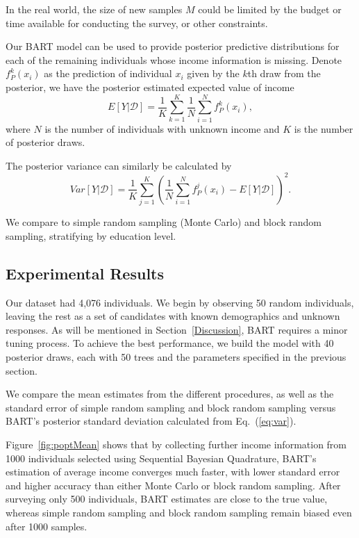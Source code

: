 In the real world, the size of new samples $M$ could be limited by the budget or time available for conducting the survey, or other constraints.

Our BART model can be used to provide posterior predictive distributions for each of the remaining individuals whose income information is missing. Denote $f_P^k(x_i)$ as the prediction of individual $x_i$ given by the $k$th  draw from the posterior, we have the posterior estimated expected value of income 
\begin{equation}
\label{eq:mean}
    E[Y|\mathcal{D}] = \frac{1}{K}\sum_{k=1}^K\frac{1}{N}\sum_{i=1}^N f_P^k(x_i),
\end{equation}
where $N$ is the number of individuals with unknown income and $K$ is the number of posterior draws.

The posterior variance can similarly be calculated by
\begin{equation}
\label{eq:var}
    Var[Y|\mathcal{D}] = \frac{1}{K}\sum_{j=1}^K\left(\frac{1}{N}\sum_{i=1}^N f_P^j(x_i) - E[Y|\mathcal{D}]\right)^2.
\end{equation}

We compare to simple random sampling (Monte Carlo) and block random sampling, stratifying by education level. 

\subsection{Experimental Results}

Our dataset had 4,076 individuals. We begin by observing 50 random individuals, leaving the rest as a set of candidates with known demographics and unknown responses. As will be mentioned in Section~\ref{Discussion}, BART requires a minor tuning process. To achieve the best performance, we build the model with 40 posterior draws, each with 50 trees and the parameters specified in the previous section.

We compare the mean estimates from the different procedures, as well as the standard error of simple random sampling and block random sampling versus BART's posterior standard deviation calculated from Eq.~(\ref{eq:var}).

Figure~\ref{fig:poptMean} shows that by collecting further income information from 1000 individuals selected using Sequential Bayesian Quadrature, BART's estimation of average income converges much faster, with lower standard error and higher accuracy than either Monte Carlo or block random sampling. After surveying only 500 individuals, BART estimates are close to the true value, whereas simple random sampling and block random sampling remain biased even after 1000 samples.


